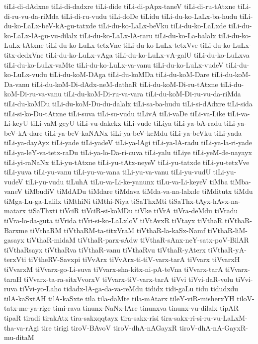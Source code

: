 {tiLi-di-dAdxne
tiLi-di-dadxre
tiLi-dide
tiLi-di-pApx-taneV
tiLi-di-ru-tAtxne
tiLi-di-ru-vu-da-riMda
tiLi-di-ru-vudu
tiLi-doDe
tiLidu
tiLi-du-ko-LaLx-ba-hudu
tiLi-du-ko-LaLx-beV-kA-gu-tatxde
tiLi-du-ko-LaLx-beVku
tiLi-du-ko-LaLxde
tiLi-du-ko-LaLx-lA-gu-vu-dilalx
tiLi-du-ko-LaLx-lA-raru
tiLi-du-ko-La-balalx
tiLi-du-ko-LuLx-tAtxne
tiLi-du-ko-LuLx-tetxVne
tiLi-du-ko-LuLx-tetxVve
tiLi-du-ko-LuLx-titx-dedxVne
tiLi-du-ko-LuLx-vAga
tiLi-du-ko-LuLx-vA-galU
tiLi-du-ko-LuLxva
tiLi-du-ko-LuLx-vaMte
tiLi-du-ko-LuLx-va-vanu
tiLi-du-ko-LuLx-vudeV
tiLi-du-ko-LuLx-vudu
tiLi-du-koM-DAga
tiLi-du-koMDa
tiLi-du-koM-Dare
tiLi-du-koM-Da-vanu
tiLi-du-koM-Di-dAdx-neM-dathaR
tiLi-du-koM-Di-ru-tAtxne
tiLi-du-koM-Di-ru-va-vanu
tiLi-du-koM-Di-ru-va-vara
tiLi-du-koM-Di-ru-vu-da-riMda
tiLi-du-koMDu
tiLi-du-koM-Du-du-dalalx
tiLi-sa-ba-hudu
tiLi-si-dAdxre
tiLi-sida
tiLi-si-ko-Du-tAtxne
tiLi-suva
tiLi-su-vudu
tiLivA
tiLi-vaDe
tiLi-va-Like
tiLi-va-Li-keyU
tiLi-vaM-geyU
tiLi-vu-dakekx
tiLi-vude
tiLiya
tiLi-ya-bA-radu
tiLi-ya-beV-kA-dare
tiLi-ya-beV-kaNANx
tiLi-ya-beV-keMdu
tiLi-ya-beVku
tiLi-yada
tiLi-ya-dayAyx
tiLi-yade
tiLi-yadeV
tiLi-ya-lAgi
tiLi-ya-lA-radu
tiLi-ya-la-ri-yade
tiLi-ya-leY-va-tetx-raDu
tiLi-ya-lo-Da-ri-cuva
tiLi-yalu
tiLiye
tiLi-yeM-de-nayayx
tiLi-yi-raNaNx
tiLi-yu-tAtxne
tiLi-yu-tAtx-neyeV
tiLi-yu-tatxde
tiLi-yu-tetxVve
tiLi-yuva
tiLi-yu-vanu
tiLi-yu-va-vana
tiLi-yu-va-vanu
tiLi-yu-vudU
tiLi-yu-vudeV
tiLi-yu-vudu
tiLuhA
tiLu-va-Li-ke-yanunx
tiLu-va-Li-keyeV
tiMba
tiMba-vaneV
tiMbudiV
tiMdADu
tiMdare
tiMdava
tiMda-va-na-lalxde
tiMditutx
tiMdu
tiMga-Lu-ga-Lalilx
tiMthiNi
tiMthi-Niya
tiSaThxMti
tiSaThx-tAyx-hAvx-na-matarx
tiSaThxti
tiVciR
tiVciR-si-koMDu
tiVke
tiVrA
tiVra-deMdu
tiVradu
tiVra-lo-da-guta
tiVrida
tiVri-si-ko-LaLxloV
tiVtAvxR
tiVtayx
tiVthaR
tiVthaR-Barxme
tiVthaRM
tiVthaRM-ta-titxVraM
tiVthaR-la-kaSx-Namf
tiVthaR-liM-gasayx
tiVthaR-midaM
tiVthaR-parx-sAdw
tiVthaR-sAnx-neY-satx-poV-BilAR
tiVthaRsayx
tiVthaRva
tiVthaR-vanu
tiVthaRvu
tiVthaR-yAterx
tiVthaR-yA-terxVti
tiVtheRV-Savxpi
tiVvArx
tiVvArx-ti-tiV-varx-tarA
tiVvarx
tiVvarxH
tiVvarxM
tiVvarx-go-Li-suva
tiVvarx-sha-kitx-ni-pA-teVna
tiVvarx-tarA
tiVvarx-taraH
tiVvarx-ta-ra-sitxVvorxV
tiVvarx-tiV-varx-tarA
tiVvi
tiVvi-daR-volu
tiVvi-ruva
tiVvi-yo-Laho
tidadx-lA-ga-da-va-reMdu
tididx
tidi-gaLu
tidu
tidudxdu
tilA-kaSxtAH
tilA-kaSxte
tila
tila-daMte
tila-mAtarx
tileY-viR-misherxYH
tiloV-tatx-me-ya-rige
timi-rava
tinunx-NaNx-lAre
tinunxva
tinunx-vu-dilalx
tipAR
tipaR
tiradi
tirakAtx
tira-sakxqqtayx
tira-sakx-risi
tira-sakx-ri-si-ru-vu-LaLxM-tha-va-rAgi
tire
tirigi
tiroV-BAvoV
tiroV-dhA-nAGayxR
tiroV-dhA-nA-GayxR-mu-ditaM
}
